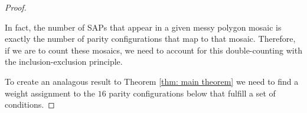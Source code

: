 \documentclass[12pt]{article}
\theoremstyle{plain}
\theoremstyle{definition}
\theoremstyle{remark}
\theoremstyle{definition}
\newcommand{\cellA}[4]{ \draw[thick] ( #1 , #2 ) rectangle ( #3 , #4 ); \draw[red, thick, densely dotted] (#3 * 0.5 + #1 * 0.5 , #2) -- (#3, #4 * 0.5 + #2 * 0.5);}
\newcommand{\cellB}[4]{ \draw[thick] ( #1 , #2 ) rectangle ( #3 , #4 ); \draw[red, thick, densely dotted] (#3 * 0.5 + #1 * 0.5 , #2) -- (#1, #4 * 0.5 + #2 * 0.5);}
\newcommand{\cellC}[4]{ \draw[thick] ( #1 , #2 ) rectangle ( #3 , #4 ); \draw[red, thick, densely dotted] (#3 * 0.5 + #1 * 0.5 , #4) -- (#1, #4 * 0.5 + #2 * 0.5);}
\newcommand{\cellD}[4]{ \draw[thick] ( #1 , #2 ) rectangle ( #3 , #4 ); \draw[red, thick, densely dotted] (#3 * 0.5 + #1 * 0.5 , #4) -- (#3, #4 * 0.5 + #2 * 0.5);}
\begin{document}
\begin{proof}
\begin{center}
\end{center}

In fact, the number of SAPs that appear in a given messy polygon mosaic is exactly the number of parity configurations that map to that mosaic. Therefore, if we are to count these mosaics, we need to account for this double-counting with the inclusion-exclusion principle.  

To create an analagous result to Theorem \ref{thm: main theorem} we need to find a weight assignment to the $16$ parity configurations below that fulfill a set of conditions.


\end{proof}
\end{document}
